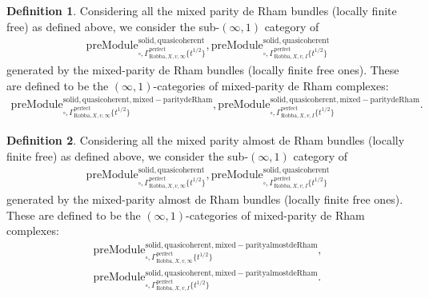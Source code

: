 \documentclass[12pt]{book}
\theoremstyle{definition}
\newtheorem{definition}{Definition}
\begin{document}
\begin{definition}
Considering all the mixed parity de Rham bundles (locally finite free) as defined above, we consider the sub-$(\infty,1)$ category of 
\begin{align}
\mathrm{preModule}^\mathrm{solid,quasicoherent}_{\square,\Gamma^\mathrm{perfect}_{\text{Robba},X,v,\infty}\{t^{1/2}\}},
\mathrm{preModule}^\mathrm{solid,quasicoherent}_{\square,\Gamma^\mathrm{perfect}_{\text{Robba},X,v,I}\{t^{1/2}\}} 
\end{align}
generated by the mixed-parity de Rham bundles (locally finite free ones). These are defined to be the $(\infty,1)$-categories of mixed-parity de Rham complexes:
\begin{align}
\mathrm{preModule}^\mathrm{solid,quasicoherent,mixed-paritydeRham}_{\square,\Gamma^\mathrm{perfect}_{\text{Robba},X,v,\infty}\{t^{1/2}\}},
\mathrm{preModule}^\mathrm{solid,quasicoherent,mixed-paritydeRham}_{\square,\Gamma^\mathrm{perfect}_{\text{Robba},X,v,I}\{t^{1/2}\}}. 
\end{align}
\end{definition}


\begin{definition}
Considering all the mixed parity almost de Rham bundles (locally finite free) as defined above, we consider the sub-$(\infty,1)$ category of 
\begin{align}
\mathrm{preModule}^\mathrm{solid,quasicoherent}_{\square,\Gamma^\mathrm{perfect}_{\text{Robba},X,v,\infty}\{t^{1/2}\}},
\mathrm{preModule}^\mathrm{solid,quasicoherent}_{\square,\Gamma^\mathrm{perfect}_{\text{Robba},X,v,I}\{t^{1/2}\}} 
\end{align}
generated by the mixed-parity almost de Rham bundles (locally finite free ones). These are defined to be the $(\infty,1)$-categories of mixed-parity de Rham complexes:
\begin{align}
\mathrm{preModule}^\mathrm{solid,quasicoherent,mixed-parityalmostdeRham}_{\square,\Gamma^\mathrm{perfect}_{\text{Robba},X,v,\infty}\{t^{1/2}\}},\\
\mathrm{preModule}^\mathrm{solid,quasicoherent,mixed-parityalmostdeRham}_{\square,\Gamma^\mathrm{perfect}_{\text{Robba},X,v,I}\{t^{1/2}\}}. 
\end{align}
\end{definition}
\end{document}
